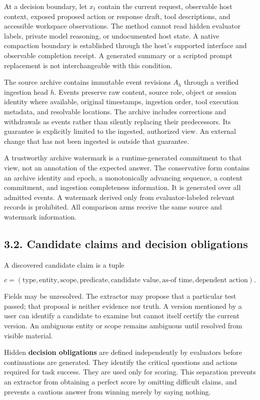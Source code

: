 \documentclass[
  11pt,
  a4paper,
]{article}
\begin{document}
At a decision boundary, let \(x_t\) contain the current request,
observable host context, exposed proposed action or response draft, tool
descriptions, and accessible workspace observations. The method cannot
read hidden evaluator labels, private model reasoning, or undocumented
host state. A native compaction boundary is established through the
host's supported interface and observable completion receipt. A
generated summary or a scripted prompt replacement is not
interchangeable with this condition.

The source archive contains immutable event revisions \(A_h\) through a
verified ingestion head \(h\). Events preserve raw content, source role,
object or session identity where available, original timestamps,
ingestion order, tool execution metadata, and resolvable locations. The
archive includes corrections and withdrawals as events rather than
silently replacing their predecessors. Its guarantee is explicitly
limited to the ingested, authorized view. An external change that has
not been ingested is outside that guarantee.

A trustworthy archive watermark is a runtime-generated commitment to
that view, not an annotation of the expected answer. The conservative
form contains an archive identity and epoch, a monotonically advancing
sequence, a content commitment, and ingestion completeness information.
It is generated over all admitted events. A watermark derived only from
evaluator-labeled relevant records is prohibited. All comparison arms
receive the same source and watermark information.

\subsection{3.2. Candidate claims and decision
obligations}\label{candidate-claims-and-decision-obligations}

A discovered candidate claim is a tuple

\[
c=(\text{type},\text{entity},\text{scope},\text{predicate},
\text{candidate value},\text{as-of time},\text{dependent action}).
\]

Fields may be unresolved. The extractor may propose that a particular
test passed; that proposal is neither evidence nor truth. A version
mentioned by a user can identify a candidate to examine but cannot
itself certify the current version. An ambiguous entity or scope remains
ambiguous until resolved from visible material.

Hidden \textbf{decision obligations} are defined independently by
evaluators before continuations are generated. They identify the
critical questions and actions required for task success. They are used
only for scoring. This separation prevents an extractor from obtaining a
perfect score by omitting difficult claims, and prevents a cautious
answer from winning merely by saying nothing.
\end{document}
